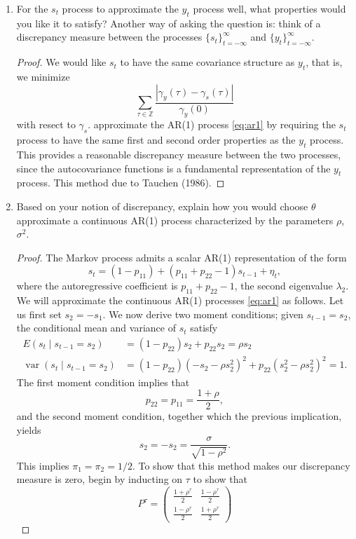 \documentclass[oneside,reqno]{amsart}
\DeclareMathOperator{\var}{var}
\newcommand{\Z}{\mathds Z}
\theoremstyle{definition}
\begin{document}
\begin{enumerate}[label=(\roman*)]
\begin{proof}
\[\]     
\end{proof}
\item
For the $s_t$ process to approximate the $y_t$ process well, what properties would you like it to satisfy? Another way of asking the question is: think of a discrepancy measure between the processes $\{s_t\}_{t=-\infty}^\infty$ and $\{y_t\}_{t=-\infty}^\infty$.
\begin{proof}
We would like $s_t$ to have the same covariance structure as $y_t$, that is, we minimize 
\[
	\sum_{\tau\in \Z} \frac{|\gamma_y(\tau) - \gamma_s(\tau)|}{\gamma_y(0)}
\] 
with resect to $\gamma_s$. approximate the AR(1) process \eqref{eq:ar1} by requiring the $s_t$ process to have the same first and second order properties as the $y_t$ process. This provides a reasonable discrepancy measure between the two processes, since the autocovariance functions is a fundamental representation of the $y_t$ process. This method due to Tauchen (1986). 
\end{proof}
\item
Based on your notion of discrepancy, explain how you would choose $\theta$  approximate a continuous AR(1) process characterized by the parameters $\rho$, $\sigma^2$.
\begin{proof}
The Markov process admits a scalar AR(1) representation of the form 
\[
	s_t  = (1 - p_{11}) + (p_{11} + p_{22}-1) s_{t-1} + \eta_t,
\]
where the autoregressive coefficient is $p_{11} + p_{22}-1$, the second eigenvalue $\lambda_2$. We will approximate the continuous AR(1) processes \eqref{eq:ar1} as follows. Let us first set $s_2 =  -s_1$. We now derive two moment conditions; given $s_{t-1}=s_2$, the conditional mean and variance of $s_t$ satisfy 
\begin{align*}
	E(s_t \mid s_{t-1}=s_2) &= (1-p_{22}) s_2  + p_{22}s_2 = \rho s_2 \\
	\var(s_t \mid s_{t-1} = s_2) &= (1-p_{22}) (-s_2 -\rho s_2^2)^2 + p_{22}(s_2^2 - \rho s_2^2)^2 = 1.
\end{align*}
The first moment condition implies that 
\[
	p_{22} = p_{11} = \frac{1+\rho}{2},
\]
and the second moment condition, together which the previous implication, yields 
\[
	s_2 = -s_2 = \frac{\sigma}{\sqrt{1-\rho^2}}.
\]
This implies $\pi_1 = \pi_2 = 1/2$. To show that this method makes our discrepancy measure is zero, begin by inducting on $\tau$ to show that
\[
	P^\tau = \begin{pmatrix}
		\frac{1+\rho^\tau}{2} & \frac{1- \rho^\tau}{2} \\
		\frac{1-\rho^\tau}{2} & \frac{1+ \rho^\tau}{2}

\end{pmatrix}\]
\end{proof}
\end{enumerate}
\end{document}
